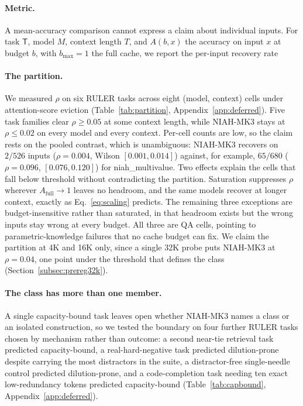 \documentclass{article}
\begin{document}
\paragraph{Metric.} A mean-accuracy comparison cannot express a claim about
individual inputs. For task $\mathsf{T}$, model $M$, context length $T$, and
$A(b, x)$ the accuracy on input $x$ at budget $b$, with $b_{\max} = 1$ the
full cache, we report the per-input recovery rate

\paragraph{The partition.} We measured $\rho$ on six RULER tasks across eight
(model, context) cells under attention-score eviction
(Table~\ref{tab:partition}, Appendix~\ref{app:deferred}). Five task families
clear $\rho \ge 0.05$ at some context length, while NIAH-MK3 stays at $\rho
\le 0.02$ on every model and every context. Per-cell counts are low, so the
claim rests on the pooled contrast, which is unambiguous: NIAH-MK3 recovers on
$2/526$ inputs ($\rho = 0.004$, Wilson $[0.001, 0.014]$) against, for example,
$65/680$ ($\rho = 0.096$, $[0.076, 0.120]$) for niah\_multivalue. Two effects explain the
cells that fall below threshold without contradicting the partition. Saturation
suppresses $\rho$ wherever $A_{\mathrm{full}} \to 1$ leaves no headroom, and the
same models recover at longer context, exactly as Eq.~\eqref{eq:scaling}
predicts. The remaining three exceptions are budget-insensitive rather than
saturated, in that headroom exists but the wrong inputs stay wrong at every
budget. All three are QA cells, pointing to parametric-knowledge failures that
no cache budget can fix. We claim the partition at 4K and 16K only, since a
single 32K probe puts NIAH-MK3 at $\rho = 0.04$, one point under the threshold
that defines the class (Section~\ref{subsec:prereg32k}).

\paragraph{The class has more than one member.} A single capacity-bound task
leaves open whether NIAH-MK3 names a class or an isolated construction, so we
tested the boundary on four further RULER tasks chosen by mechanism rather
than outcome: a second near-tie retrieval task predicted capacity-bound, a
real-hard-negative task predicted dilution-prone despite carrying the most
distractors in the suite, a distractor-free single-needle control predicted
dilution-prone, and a code-completion task needing ten exact low-redundancy
tokens predicted capacity-bound (Table~\ref{tab:capbound},
Appendix~\ref{app:deferred}).
\end{document}
